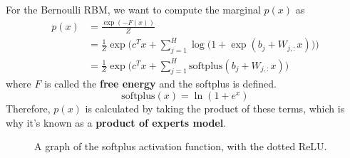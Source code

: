 \documentclass{article}
\begin{document}
    \begin{lemma}
      \label{thm:free-energy}
 
      For the Bernoulli RBM, we want to compute the marginal $p(x)$ as
      \begin{align*} 
      p(x) & = \frac{\exp(-F(x))}{Z} \\
                    & = \frac{1}{Z} \exp \bigg( c^T x + \sum_{j=1}^H \log \big( 1 + \exp (b_j + W_{j, :} x) \big) \bigg) \\
                    & = \frac{1}{Z} \exp \bigg( c^T x + \sum_{j=1}^H \mathrm{softplus}(b_j + W_{j, :} x ) \bigg)
      \end{align*}
      where $F$ is called the \textbf{free energy} and the softplus is defined. 
      \begin{equation}
        \text{softplus}(x) = \ln(1 + e^x)
      \end{equation}
      Therefore, $p(x)$ is calculated by taking the product of these terms, which is why it's known as a \textbf{product of experts model}. 

      \begin{figure}[H]
        \centering 
        \caption{A graph of the softplus activation function, with the dotted ReLU.} 
        \label{fig:softplus}
      \end{figure}
    \end{lemma}
\end{document}
